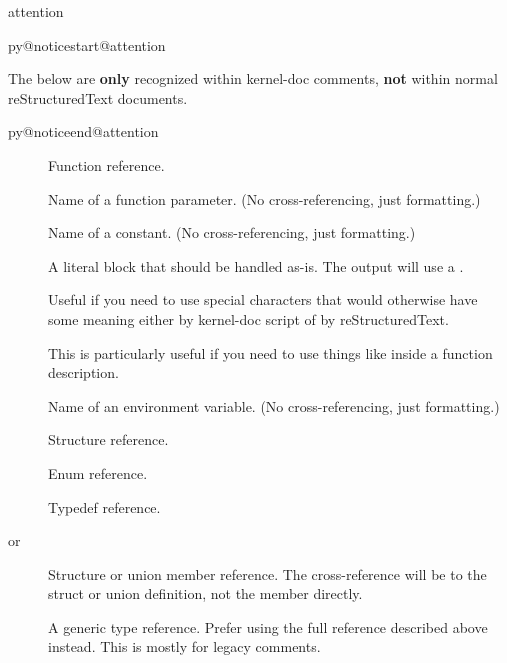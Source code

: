 \documentclass[a4paper,8pt,english]{sphinxmanual}
\makeatletter
\renewenvironment{notice}[2]{%
          \def\py@noticetype{#1}
          \begin{coloredbox}{#1}
          \bf\it
          \par\strong{#2}
          \csname py@noticestart@#1\endcsname
        }
	{
          \csname py@noticeend@\py@noticetype\endcsname
          \end{coloredbox}
        }
\makeatother
\begin{document}
\begin{notice}{attention}{Attention:}
The below are \textbf{only} recognized within kernel-doc comments,
\textbf{not} within normal reStructuredText documents.
\end{notice}
\begin{description}
\item[{}] \leavevmode
Function reference.

\item[{}] \leavevmode
Name of a function parameter. (No cross-referencing, just formatting.)

\item[{}] \leavevmode
Name of a constant. (No cross-referencing, just formatting.)

\item[{}] \leavevmode
A literal block that should be handled as-is. The output will use a
.

Useful if you need to use special characters that would otherwise have some
meaning either by kernel-doc script of by reStructuredText.

This is particularly useful if you need to use things like  inside
a function description.

\item[{}] \leavevmode
Name of an environment variable. (No cross-referencing, just formatting.)

\item[{}] \leavevmode
Structure reference.

\item[{}] \leavevmode
Enum reference.

\item[{}] \leavevmode
Typedef reference.

\item[{ or }] \leavevmode
Structure or union member reference. The cross-reference will be to the struct
or union definition, not the member directly.

\item[{}] \leavevmode
A generic type reference. Prefer using the full reference described above
instead. This is mostly for legacy comments.

\end{description}
\end{document}
